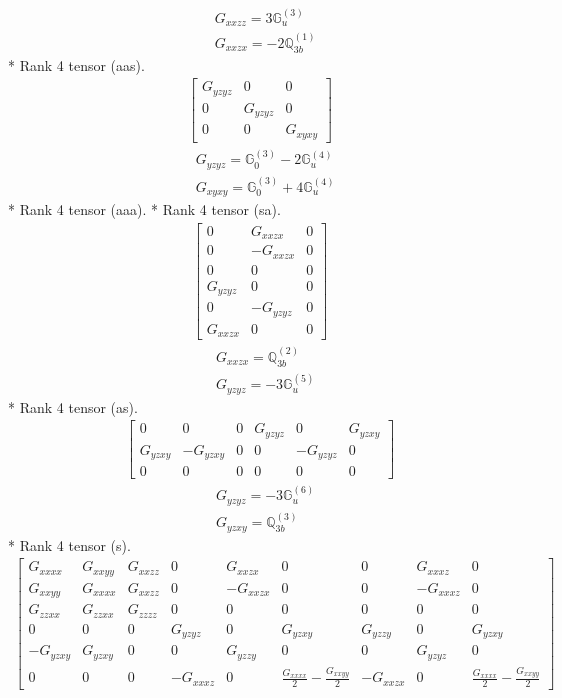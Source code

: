 \documentclass[fleqn,8pt,landscape]{jsarticle}
\begin{document}
\begin{align*}
& G_{xxzz} = 3 \mathbb{G}_{u}^{(3)} \\
& G_{xxzx} = - 2 \mathbb{Q}_{3b}^{(1)}
\end{align*}
* Rank 4 tensor (aas).
\begin{align*}
\begin{bmatrix} G_{yzyz} & 0 & 0 \\ 0 & G_{yzyz} & 0 \\ 0 & 0 & G_{xyxy} \end{bmatrix}
\end{align*}
\begin{align*}
& G_{yzyz} = \mathbb{G}_{0}^{(3)} - 2 \mathbb{G}_{u}^{(4)} \\
& G_{xyxy} = \mathbb{G}_{0}^{(3)} + 4 \mathbb{G}_{u}^{(4)}
\end{align*}
* Rank 4 tensor (aaa).
* Rank 4 tensor (sa).
\begin{align*}
\begin{bmatrix} 0 & G_{xxzx} & 0 \\ 0 & - G_{xxzx} & 0 \\ 0 & 0 & 0 \\ G_{yzyz} & 0 & 0 \\ 0 & - G_{yzyz} & 0 \\ G_{xxzx} & 0 & 0 \end{bmatrix}
\end{align*}
\begin{align*}
& G_{xxzx} = \mathbb{Q}_{3b}^{(2)} \\
& G_{yzyz} = - 3 \mathbb{G}_{u}^{(5)}
\end{align*}
* Rank 4 tensor (as).
\begin{align*}
\begin{bmatrix} 0 & 0 & 0 & G_{yzyz} & 0 & G_{yzxy} \\ G_{yzxy} & - G_{yzxy} & 0 & 0 & - G_{yzyz} & 0 \\ 0 & 0 & 0 & 0 & 0 & 0 \end{bmatrix}
\end{align*}
\begin{align*}
& G_{yzyz} = - 3 \mathbb{G}_{u}^{(6)} \\
& G_{yzxy} = \mathbb{Q}_{3b}^{(3)}
\end{align*}
* Rank 4 tensor (s).
\begin{align*}
\begin{bmatrix} G_{xxxx} & G_{xxyy} & G_{xxzz} & 0 & G_{xxzx} & 0 & 0 & G_{xxxz} & 0 \\ G_{xxyy} & G_{xxxx} & G_{xxzz} & 0 & - G_{xxzx} & 0 & 0 & - G_{xxxz} & 0 \\ G_{zzxx} & G_{zzxx} & G_{zzzz} & 0 & 0 & 0 & 0 & 0 & 0 \\ 0 & 0 & 0 & G_{yzyz} & 0 & G_{yzxy} & G_{yzzy} & 0 & G_{yzxy} \\ - G_{yzxy} & G_{yzxy} & 0 & 0 & G_{yzzy} & 0 & 0 & G_{yzyz} & 0 \\ 0 & 0 & 0 & - G_{xxxz} & 0 & \frac{G_{xxxx}}{2} - \frac{G_{xxyy}}{2} & - G_{xxzx} & 0 & \frac{G_{xxxx}}{2} - \frac{G_{xxyy}}{2} \end{bmatrix}
\end{align*}
\end{document}
